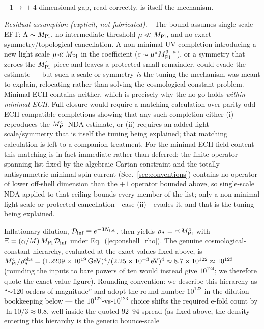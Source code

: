 \documentclass[aps,prd,twocolumn,superscriptaddress,showpacs,preprintnumbers,nofootinbib,longbibliography,floatfix]{revtex4-2}
\newcommand{\MPl}{M_{\rm Pl}}
\newcommand{\Dinf}{\mathcal{D}_{\rm inf}}
\begin{document}
$+1\!\to\!+4$ dimensional gap, read correctly, is itself the mechanism.
\par
\textit{Residual assumption (explicit, not fabricated).}---The bound assumes
single-scale EFT: $\Lambda\sim\MPl$, no intermediate threshold $\mu\ll\MPl$,
and no exact symmetry/topological cancellation. A non-minimal UV completion
introducing a new light scale $\mu\!\ll\!\MPl$ in the coefficient
($c\sim\mu^{a}\MPl^{3-a}$), or a symmetry that zeroes the $\MPl^{4}$ piece
and leaves a protected small remainder, could evade the estimate --- but such
a scale or symmetry \emph{is} the tuning the mechanism was meant to explain,
relocating rather than solving the cosmological-constant problem. Minimal ECH
contains neither, which is precisely why the no-go holds \emph{within minimal
ECH}. Full closure would require a matching calculation over parity-odd
ECH-compatible completions showing that any such completion either (i)
reproduces the $\MPl^{4}$ NDA estimate, or (ii) requires an added light
scale/symmetry that is itself the tuning being explained; that matching
calculation is left to a companion treatment.
For the minimal-ECH field content this matching is in fact immediate rather
than deferred: the finite operator spanning list fixed by the algebraic Cartan
constraint and the totally-antisymmetric minimal spin current
(Sec.~\ref{sec:conventions}) contains no operator of lower off-shell
dimension than the $+1$ operator bounded above, so single-scale NDA applied to
that ceiling bounds every member of the list; only a non-minimal light scale
or protected cancellation---case (ii)---evades it, and that is the tuning being
explained.
\par
Inflationary dilution, $\Dinf \equiv e^{-3N_{\rm tot}}$, then yields
$\rho_\Lambda = \Xi\,\MPl^4$ with $\Xi = (\alpha/M)\,\MPl\,\Dinf$ under
Eq.~(\ref{eq:onshell_rho}). The genuine cosmological-constant hierarchy,
evaluated at the exact values fixed above, is
$\MPl^4/\rho_\Lambda^{\rm obs}=
(1.2209\times10^{19}\,\text{GeV})^4/(2.25\times10^{-3}\,\text{eV})^4
\approx 8.7\times10^{122}\approx 10^{123}$
(rounding the inputs to bare powers of ten would instead give $10^{124}$;
we therefore quote the exact-value figure). Rounding convention: we
describe this hierarchy as ``${\sim}120$ orders of magnitude'' and adopt
the round number $10^{122}$ in the dilution bookkeeping below --- the
$10^{122}$-vs-$10^{123}$ choice shifts the required e-fold count by
$\ln10/3\approx0.8$, well inside the quoted $92$--$94$ spread (as fixed
above, the density entering this hierarchy is the generic bounce-scale
\end{document}

